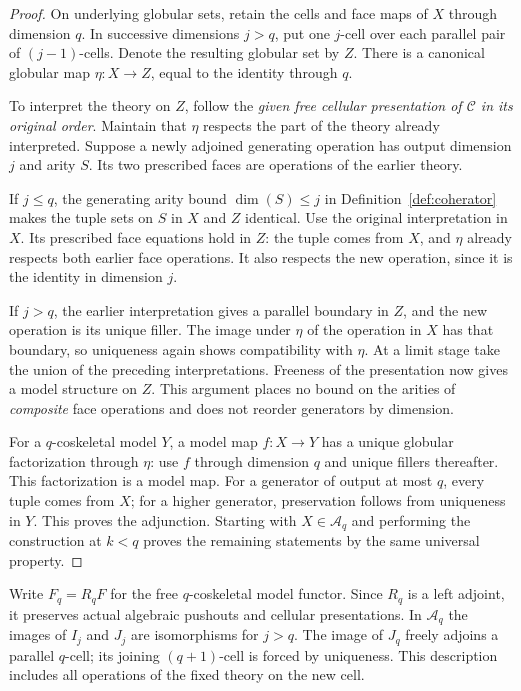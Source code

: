 \begin{proof}
On underlying globular sets, retain the cells and face maps of $X$
through dimension $q$.  In successive dimensions $j>q$, put one
$j$-cell over each parallel pair of $(j-1)$-cells.  Denote the resulting
globular set by $Z$.  There is a canonical globular map $\eta:X\to Z$,
equal to the identity through $q$.

To interpret the theory on $Z$, follow the \emph{given free cellular
presentation of $\mathcal C$ in its original order}.  Maintain that
$\eta$ respects the part of the theory already interpreted.  Suppose
a newly adjoined generating operation has output dimension $j$ and
arity $S$.  Its two prescribed faces are operations of the earlier
theory.

If $j\leq q$, the generating arity bound
$\dim(S)\leq j$ in Definition~\ref{def:coherator} makes the tuple sets
on $S$ in $X$ and $Z$ identical.  Use the original interpretation in
$X$.  Its prescribed face equations hold in $Z$: the tuple comes
from $X$, and $\eta$ already respects both earlier face operations.
It also respects the new operation, since it is the identity in
dimension $j$.

If $j>q$, the earlier interpretation gives a parallel boundary in
$Z$, and the new operation is its unique filler.  The image under
$\eta$ of the operation in $X$ has that boundary, so uniqueness again
shows compatibility with $\eta$.  At a limit stage take the union of
the preceding interpretations.  Freeness of the presentation now
gives a model structure on $Z$.  This argument places no bound on
the arities of \emph{composite} face operations and does not reorder
generators by dimension.

For a $q$-coskeletal model $Y$, a model map $f:X\to Y$ has a unique
globular factorization through $\eta$: use $f$ through dimension $q$
and unique fillers thereafter.  This factorization is a model map.
For a generator of output at most $q$, every tuple comes from $X$;
for a higher generator, preservation follows from uniqueness in
$Y$.  This proves the adjunction.  Starting with $X\in\mathcal A_q$
and performing the construction at $k<q$ proves the remaining
statements by the same universal property.
\end{proof}

Write $F_q=R_qF$ for the free $q$-coskeletal model functor.  Since
$R_q$ is a left adjoint, it preserves actual algebraic pushouts and
cellular presentations.  In $\mathcal A_q$ the images of $I_j$ and
$J_j$ are isomorphisms for $j>q$.  The image of $J_q$ freely adjoins
a parallel $q$-cell; its joining $(q+1)$-cell is forced by uniqueness.
This description includes all operations of the fixed theory on the
new cell.

